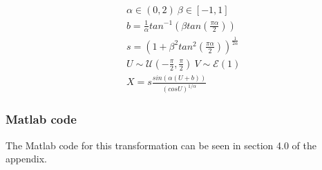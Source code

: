 \documentclass[twoside,twocolumn]{article}
\begin{document}
\begin{equation}
\label{eq:4equ}
\begin{split}
&\alpha \in (0,2) \: \beta \in [-1,1]\\
&b=\frac{1}{\alpha}tan^{-1}(\beta tan(\frac{\pi\alpha}{2}))\\
&s=(1+\beta^2tan^2(\frac{\pi\alpha}{2}))^{\frac{1}{2\alpha}}\\
&U\sim\mathcal{U}(-\frac{\pi}{2},\frac{\pi}{2})\:V\sim\mathcal{E}(1)\\
& X=s\frac{sin(\alpha(U+b))}{(cosU)^{1/\alpha}}%
\end{split}
\end{equation}

\subsubsection{Matlab code} %
The Matlab code for this transformation can be seen in section 4.0 of the appendix.


\end{document}
